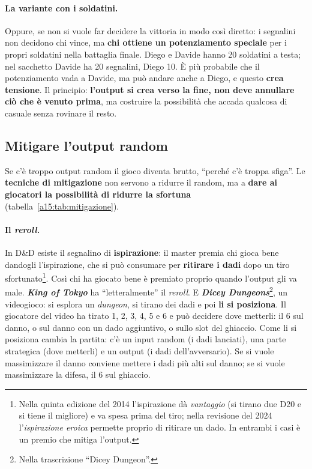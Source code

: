 \paragraph{La variante con i soldatini.} Oppure, se non si vuole far decidere la vittoria in
modo così diretto: i segnalini non decidono chi vince, ma \textbf{chi ottiene un potenziamento
speciale} per i propri soldatini nella battaglia finale. Diego e Davide hanno 20 soldatini a
testa; nel sacchetto Davide ha 20 segnalini, Diego 10. È più probabile che il potenziamento
vada a Davide, ma può andare anche a Diego, e questo \textbf{crea tensione}. Il principio:
\textbf{l'output si crea verso la fine, non deve annullare ciò che è venuto prima}, ma
costruire la possibilità che accada qualcosa di casuale senza rovinare il resto.

\subsection{Mitigare l'output random}

Se c'è troppo output random il gioco diventa brutto, ``perché c'è troppa sfiga''. Le
\textbf{tecniche di mitigazione} non servono a ridurre il random, ma a \textbf{dare ai
giocatori la possibilità di ridurre la sfortuna} (tabella~\ref{a15:tab:mitigazione}).

\paragraph{Il \emph{reroll}.} In D\&D esiste il segnalino di \textbf{ispirazione}: il master
premia chi gioca bene dandogli l'ispirazione, che si può consumare per \textbf{ritirare i
dadi} dopo un tiro sfortunato\footnote{Nella quinta edizione del 2014 l'ispirazione dà
\emph{vantaggio} (si tirano due D20 e si tiene il migliore) e va spesa prima del tiro; nella
revisione del 2024 l'\emph{ispirazione eroica} permette proprio di ritirare un dado. In
entrambi i casi è un premio che mitiga l'output.}. Così chi ha giocato bene è premiato
proprio quando l'output gli va male. \textbf{\emph{King of Tokyo}} ha ``letteralmente'' il
\emph{reroll}. E \textbf{\emph{Dicey Dungeons}}\footnote{Nella trascrizione ``Dicey
Dungeon''.}, un videogioco: si esplora un \emph{dungeon}, si tirano dei dadi e poi \textbf{li
si posiziona}. Il giocatore del video ha tirato 1, 2, 3, 4, 5 e 6 e può decidere dove
metterli: il 6 sul danno, o sul danno con un dado aggiuntivo, o sullo slot del ghiaccio. Come
li si posiziona cambia la partita: c'è un input random (i dadi lanciati), una parte
strategica (dove metterli) e un output (i dadi dell'avversario). Se si vuole massimizzare il
danno conviene mettere i dadi più alti sul danno; se si vuole massimizzare la difesa, il 6 sul
ghiaccio.

